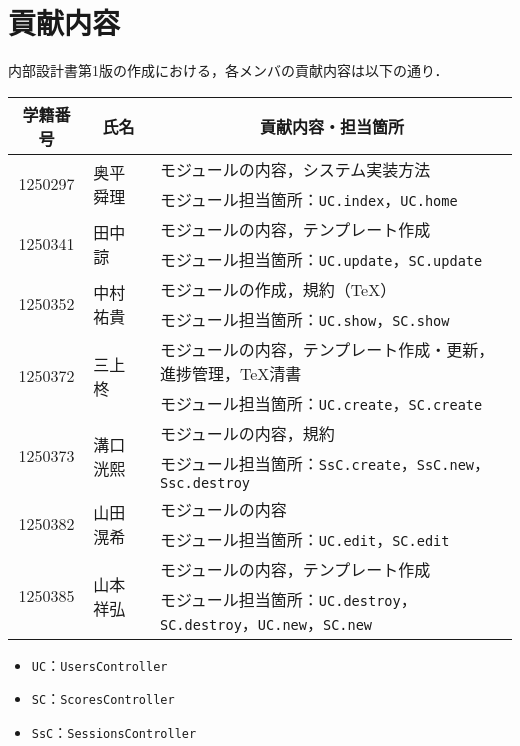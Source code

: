 \chapter{貢献内容}
内部設計書第1版の作成における，各メンバの貢献内容は以下の通り．
\begin{table}[h]
    \centering
    \begin{tabularx}{\textwidth}{cll}
        \multicolumn{1}{c}{学籍番号} & \multicolumn{1}{c}{氏名} & \multicolumn{1}{c}{貢献内容・担当箇所}\\
        \hline
        \multirow{2}{*}{1250297} & \multirow{2}{*}{奥平 舜理} & モジュールの内容，システム実装方法\\
                                 &                        & モジュール担当箇所：\texttt{UC.index}，\texttt{UC.home}\\
        \hline
        \multirow{2}{*}{1250341} & \multirow{2}{*}{田中 諒}  & モジュールの内容，テンプレート作成\\
                                 &                        & モジュール担当箇所：\texttt{UC.update}，\texttt{SC.update}\\
        \hline
        \multirow{2}{*}{1250352} & \multirow{2}{*}{中村 祐貴} &  モジュールの作成，規約（\TeX ）\\
                                 &                        & モジュール担当箇所：\texttt{UC.show}，\texttt{SC.show}\\
        \hline
        \multirow{2}{*}{1250372} & \multirow{2}{*}{三上 柊}  &  モジュールの内容，テンプレート作成・更新，進捗管理，\TeX 清書 \\
                                 &                        & モジュール担当箇所：\texttt{UC.create}，\texttt{SC.create}\\
        \hline
        \multirow{2}{*}{1250373} & \multirow{2}{*}{溝口 洸熙} & モジュールの内容，規約\\
                                 &                        & モジュール担当箇所：\texttt{SsC.create}，\texttt{SsC.new}，\texttt{Ssc.destroy}\\
        \hline
        \multirow{2}{*}{1250382} & \multirow{2}{*}{山田 滉希} & モジュールの内容\\
                                 &                        & モジュール担当箇所：\texttt{UC.edit}，\texttt{SC.edit}\\
        \hline
        \multirow{2}{*}{1250385} & \multirow{2}{*}{山本 祥弘} & モジュールの内容，テンプレート作成\\
                                 &                        & モジュール担当箇所：\texttt{UC.destroy}，\texttt{SC.destroy}，\texttt{UC.new}，\texttt{SC.new}\\
        \hline
    \end{tabularx}
\end{table}
\begin{itemize}
    \item \texttt{UC}：\texttt{UsersController}
    \item \texttt{SC}：\texttt{ScoresController}
    \item \texttt{SsC}：\texttt{SessionsController}
\end{itemize}
